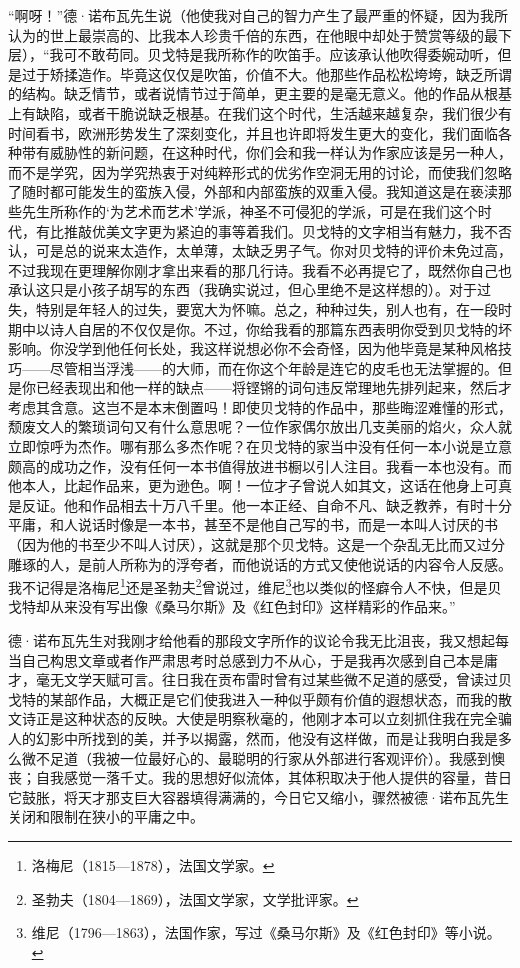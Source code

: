 \par “啊呀！”德·诺布瓦先生说（他使我对自己的智力产生了最严重的怀疑，因为我所认为的世上最崇高的、比我本人珍贵千倍的东西，在他眼中却处于赞赏等级的最下层），“我可不敢苟同。贝戈特是我所称作的吹笛手。应该承认他吹得委婉动听，但是过于矫揉造作。毕竟这仅仅是吹笛，价值不大。他那些作品松松垮垮，缺乏所谓的结构。缺乏情节，或者说情节过于简单，更主要的是毫无意义。他的作品从根基上有缺陷，或者干脆说缺乏根基。在我们这个时代，生活越来越复杂，我们很少有时间看书，欧洲形势发生了深刻变化，并且也许即将发生更大的变化，我们面临各种带有威胁性的新问题，在这种时代，你们会和我一样认为作家应该是另一种人，而不是学究，因为学究热衷于对纯粹形式的优劣作空洞无用的讨论，而使我们忽略了随时都可能发生的蛮族入侵，外部和内部蛮族的双重入侵。我知道这是在亵渎那些先生所称作的‘为艺术而艺术’学派，神圣不可侵犯的学派，可是在我们这个时代，有比推敲优美文字更为紧迫的事等着我们。贝戈特的文字相当有魅力，我不否认，可是总的说来太造作，太单薄，太缺乏男子气。你对贝戈特的评价未免过高，不过我现在更理解你刚才拿出来看的那几行诗。我看不必再提它了，既然你自己也承认这只是小孩子胡写的东西（我确实说过，但心里绝不是这样想的）。对于过失，特别是年轻人的过失，要宽大为怀嘛。总之，种种过失，别人也有，在一段时期中以诗人自居的不仅仅是你。不过，你给我看的那篇东西表明你受到贝戈特的坏影响。你没学到他任何长处，我这样说想必你不会奇怪，因为他毕竟是某种风格技巧——尽管相当浮浅——的大师，而在你这个年龄是连它的皮毛也无法掌握的。但是你已经表现出和他一样的缺点——将铿锵的词句违反常理地先排列起来，然后才考虑其含意。这岂不是本末倒置吗！即使贝戈特的作品中，那些晦涩难懂的形式，颓废文人的繁琐词句又有什么意思呢？一位作家偶尔放出几支美丽的焰火，众人就立即惊呼为杰作。哪有那么多杰作呢？在贝戈特的家当中没有任何一本小说是立意颇高的成功之作，没有任何一本书值得放进书橱以引人注目。我看一本也没有。而他本人，比起作品来，更为逊色。啊！一位才子曾说人如其文，这话在他身上可真是反证。他和作品相去十万八千里。他一本正经、自命不凡、缺乏教养，有时十分平庸，和人说话时像是一本书，甚至不是他自己写的书，而是一本叫人讨厌的书（因为他的书至少不叫人讨厌），这就是那个贝戈特。这是一个杂乱无比而又过分雕琢的人，是前人所称为的浮夸者，而他说话的方式又使他说话的内容令人反感。我不记得是洛梅尼\footnote{洛梅尼（1815—1878），法国文学家。}还是圣勃夫\footnote{圣勃夫（1804—1869），法国文学家，文学批评家。}曾说过，维尼\footnote{维尼（1796—1863），法国作家，写过《桑马尔斯》及《红色封印》等小说。}也以类似的怪癖令人不快，但是贝戈特却从来没有写出像《桑马尔斯》及《红色封印》这样精彩的作品来。”
\par 德·诺布瓦先生对我刚才给他看的那段文字所作的议论令我无比沮丧，我又想起每当自己构思文章或者作严肃思考时总感到力不从心，于是我再次感到自己本是庸才，毫无文学天赋可言。往日我在贡布雷时曾有过某些微不足道的感受，曾读过贝戈特的某部作品，大概正是它们使我进入一种似乎颇有价值的遐想状态，而我的散文诗正是这种状态的反映。大使是明察秋毫的，他刚才本可以立刻抓住我在完全骗人的幻影中所找到的美，并予以揭露，然而，他没有这样做，而是让我明白我是多么微不足道（我被一位最好心的、最聪明的行家从外部进行客观评价）。我感到懊丧；自我感觉一落千丈。我的思想好似流体，其体积取决于他人提供的容量，昔日它鼓胀，将天才那支巨大容器填得满满的，今日它又缩小，骤然被德·诺布瓦先生关闭和限制在狭小的平庸之中。
